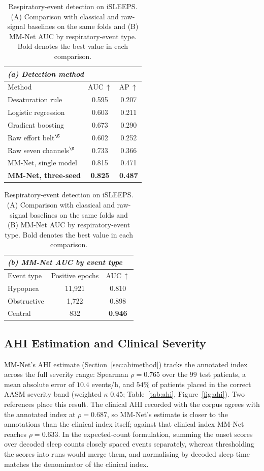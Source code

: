 \documentclass[a4paper,fleqn]{cas-sc}
\newcommand{\mmRho}{0.765}
\begin{document}
\begin{table}[H]
\caption{Respiratory-event detection on iSLEEPS. (A) Comparison with classical and raw-signal baselines on the same folds and (B) MM-Net AUC by respiratory-event type. Bold denotes the best value in each comparison.}
\label{tab:resp}
\centering
\small
\begin{tabular}{lcc}
\toprule
\multicolumn{3}{l}{\textit{(a) Detection method}}\\
\midrule
Method & AUC\,$\uparrow$ & AP\,$\uparrow$ \\
\midrule
Desaturation rule    & 0.595 & 0.207 \\
Logistic regression  & 0.603 & 0.211 \\
Gradient boosting    & 0.673 & 0.290 \\
Raw effort belt$^{\S}$~\cite{nassi2022effortbelt} & 0.602 & 0.252 \\
Raw seven channels$^{\S}$ & 0.733 & 0.366 \\
MM-Net, single model & 0.815 & 0.471 \\
\textbf{MM-Net, three-seed} & \textbf{0.825} & \textbf{0.487} \\
\bottomrule
\end{tabular}

\vspace{4pt}
\begin{tabular}{lcc}
\toprule
\multicolumn{3}{l}{\textit{(b) MM-Net AUC by event type}}\\
\midrule
Event type & Positive epochs & AUC\,$\uparrow$ \\
\midrule
Hypopnea    & 11{,}921 & 0.810 \\
Obstructive & 1{,}722  & 0.898 \\
Central     & 832      & \textbf{0.946} \\
\bottomrule
\end{tabular}
\end{table}

\subsection{AHI Estimation and Clinical Severity}
\label{sec:ahi}
MM-Net's AHI estimate (Section~\ref{sec:ahimethod}) tracks the annotated index across the full
severity range: Spearman $\rho=\mmRho$ over the $99$ test patients, a mean absolute error of
$10.4$ events/h, and $54\%$ of patients placed in the correct AASM severity band (weighted
$\kappa$ $0.45$; Table~\ref{tab:ahi}, Figure~\ref{fig:ahi}). Two references place this result.
The clinical AHI recorded with the corpus agrees with the annotated index at $\rho=0.687$, so
MM-Net's estimate is closer to the annotations than the clinical index itself; against that
clinical index MM-Net reaches $\rho=0.633$. In the expected-count formulation, summing the onset scores over decoded sleep counts closely spaced events separately, whereas thresholding the scores into runs would merge them, and normalising by decoded sleep time matches the denominator of the clinical index.
\end{document}
